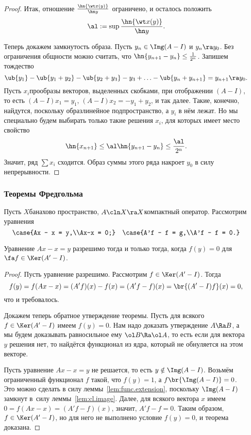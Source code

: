 \documentclass[a4paper]{article}
\begin{document}
\begin{proof}
Итак, отношение $\frac{\hn{\wt x(y)}}{\hn y}$ ограничено, и осталось положить
$$\al := \sup \frac{\hn{\wt x(y)}}{\hn y}.$$

Теперь докажем замкнутость образа. Пусть $y_n \in \Img(A - I)$ и $y_n \ra y_0$. Без ограничения общности можно
считать, что $\hn{y_{n+1} - y_n} \le\frac1{2^n}$.
Запишем тождество
$$\ub{y_1} - \ub{y_1 + y_2} - \ub{y_2 + y_3} - y_3+\ldots -\ub{y_n+ y_{n+1}} = y_{n+1} \ra y_0.$$
Пусть $x_i$\т прообразы векторов, выделенных скобками, при отображении $(A-I)$, то есть $(A-I)x_1 = y_1$,
$(A-I)x_2 = -y_1 + y_2$, и так далее. Такие, конечно, найдутся, поскольку образ\т линейное подпространство,
а $y_i$ в нём лежат. Но мы специально будем выбирать только такие решения $x_i$, для которых имеет место
свойство
$$\hn{x_{n+1}} \le \al\hn{y_{n+1}-y_n} \le \frac{\al}{2^n}.$$
Значит, ряд $\sum x_i$ сходится. Образ суммы этого ряда накроет $y_0$ в силу непрерывности.
\end{proof}

\subsubsection{Теоремы Фредгольма}

Пусть $X$\т банахово пространство, $A\cln X \ra X$\т компактный оператор. Рассмотрим уравнения
$$\case{Ax - x = y,\\Ax-x = 0;} \quad \case{A'f - f = g,\\A'f - f = 0.}$$

\begin{theorem}
Уравнение $Ax-x = y$ разрешимо тогда и только тогда, когда $f(y) = 0$ для $\fa f \in \Ker(A'-I)$.
\end{theorem}
\begin{proof}
Пусть уравнение разрешимо. Рассмотрим $f \in \Ker(A'-I)$. Тогда
$$f(y) = f(Ax-x) = (A'f)(x) - f(x) = (A'f-f)(x)= \br{(A'-I)f}(x) = 0,$$
что и требовалось.

Докажем теперь обратное утверждение теоремы. Пусть для всякого $f \in \Ker(A' - I)$ имеем $f(y) = 0$.
Нам надо доказать утверждение $A \Ra B$, а мы будем доказывать равносильное ему $\ol B \Ra \ol A$,
то есть если для вектора~$y$ решения нет, то найдётся функционал из ядра, который не обнуляется
на этом векторе.

Пусть уравнение $Ax -x = y$ не решается, то есть $y \notin \Img(A - I)$. Возьмём ограниченный
функционал $f$ такой, что $f(y) = 1$, а $f\br{\Img(A - I)} = 0$.
Это можно сделать в силу леммы~\ref{lem:func.extension}, поскольку $\Img(A-I)$ замкнут
в~силу леммы~\ref{lem:cl.image}.
Далее, для всякого вектора $x$ имеем $0 = f(Ax - x) = (A'f-f)(x)$, значит, $A'f-f = 0$. Таким
образом, $f \in \Ker(A'-I)$, но для него не выполнено условие $f(y) = 0$, и теорема доказана.
\end{proof}
\end{document}

